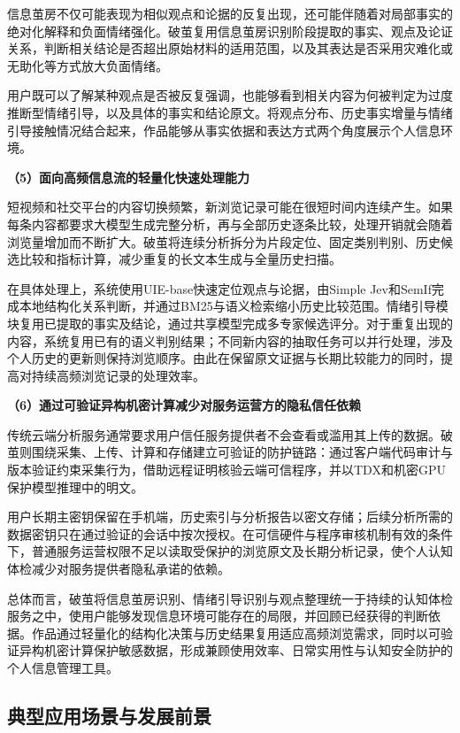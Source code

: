 信息茧房不仅可能表现为相似观点和论据的反复出现，还可能伴随着对局部事实的绝对化解释和负面情绪强化。破茧复用信息茧房识别阶段提取的事实、观点及论证关系，判断相关结论是否超出原始材料的适用范围，以及其表达是否采用灾难化或无助化等方式放大负面情绪。

用户既可以了解某种观点是否被反复强调，也能够看到相关内容为何被判定为过度推断型情绪引导，以及具体的事实和结论原文。将观点分布、历史事实增量与情绪引导接触情况结合起来，作品能够从事实依据和表达方式两个角度展示个人信息环境。

\textbf{（5）面向高频信息流的轻量化快速处理能力}

短视频和社交平台的内容切换频繁，新浏览记录可能在很短时间内连续产生。如果每条内容都要求大模型生成完整分析，再与全部历史逐条比较，处理开销就会随着浏览量增加而不断扩大。破茧将连续分析拆分为片段定位、固定类别判别、历史候选比较和指标计算，减少重复的长文本生成与全量历史扫描。

在具体处理上，系统使用UIE-base快速定位观点与论据，由Simple Jev和SemIf完成本地结构化关系判断，并通过BM25与语义检索缩小历史比较范围。情绪引导模块复用已提取的事实及结论，通过共享模型完成多专家候选评分。对于重复出现的内容，系统复用已有的语义判别结果；不同新内容的抽取任务可以并行处理，涉及个人历史的更新则保持浏览顺序。由此在保留原文证据与长期比较能力的同时，提高对持续高频浏览记录的处理效率。

\textbf{（6）通过可验证异构机密计算减少对服务运营方的隐私信任依赖}

传统云端分析服务通常要求用户信任服务提供者不会查看或滥用其上传的数据。破茧则围绕采集、上传、计算和存储建立可验证的防护链路：通过客户端代码审计与版本验证约束采集行为，借助远程证明核验云端可信程序，并以TDX和机密GPU保护模型推理中的明文。

用户长期主密钥保留在手机端，历史索引与分析报告以密文存储；后续分析所需的数据密钥只在通过验证的会话中按次授权。在可信硬件与程序审核机制有效的条件下，普通服务运营权限不足以读取受保护的浏览原文及长期分析记录，使个人认知体检减少对服务提供者隐私承诺的依赖。

总体而言，破茧将信息茧房识别、情绪引导识别与观点整理统一于持续的认知体检服务之中，使用户能够发现信息环境可能存在的局限，并回顾已经获得的判断依据。作品通过轻量化的结构化决策与历史结果复用适应高频浏览需求，同时以可验证异构机密计算保护敏感数据，形成兼顾使用效率、日常实用性与认知安全防护的个人信息管理工具。

\subsection{典型应用场景与发展前景}\label{section:1.5}

